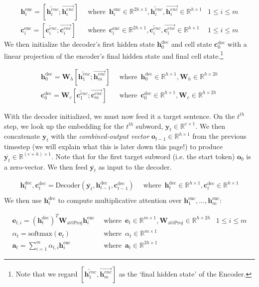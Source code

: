 \documentclass{assignment format}
\newcommand{\Real}{\mathbb{R}}
\newcommand{\henc}{\mathbf{h}^{\text{enc}}}
\newcommand{\hencfw}[1]{\overrightarrow{\mathbf{h}^{enc}_{#1}}}
\newcommand{\hencbw}[1]{\overleftarrow{\mathbf{h}^{enc}_{#1}}}
\newcommand{\cenc}{\mathbf{c}^{\text{enc}}}
\newcommand{\cencfw}[1]{\overrightarrow{\mathbf{c}^{enc}_{#1}}}
\newcommand{\cencbw}[1]{\overleftarrow{\mathbf{c}^{enc}_{#1}}}
\newcommand{\hdec}{\mathbf{h}^{\text{dec}}}
\newcommand{\cdec}{\mathbf{c}^{\text{dec}}}
\begin{document}
\begin{align}
    \henc_i = [\hencbw{i}; \hencfw{i}] \enspace &\text{where}\enspace \henc_i \in \Real^{2h \times 1}, \hencbw{i}, \hencfw{i} \in \Real^{h \times 1} &1 \le i \le m \\
    \cenc_i = [\cencbw{i}; \cencfw{i}] \enspace &\text{where} \enspace \cenc_i \in \Real^{2h \times 1}, \cencbw{i}, \cencfw{i} \in \Real^{h \times 1} &1 \le i \le m
\end{align}
We then initialize the decoder's first hidden state $\hdec_0$ and cell state $\cdec_0$ with a linear projection of the encoder's final hidden state and final cell state.\footnote{Note that we regard $[\hencbw{1}, \hencfw{m}]$ as the `final hidden state' of the Encoder.} 

\begin{align}
    \hdec_0 = \mathbf{W}_{h}[\hencbw{1}; \hencfw{m}] \enspace &\text{where} \enspace \hdec_0 \in \Real^{h \times 1}, \mathbf{W}_{h} \in \Real^{h \times 2h}\\
    \cdec_0 = \mathbf{W}_{c}[\cencbw{1}; \cencfw{m}] \enspace &\text{where} \enspace \cdec_0 \in \Real^{h \times 1}, \mathbf{W}_{c} \in \Real^{h \times 2h}
\end{align}


With the decoder initialized, we must now feed it a target sentence. On the $t^{th}$ step, we look up the embedding for the $t^{th}$ subword,  $\mathbf{y}_t \in \Real^{e \times 1}$. We then concatenate $\mathbf{y}_t$ with the \textit{combined-output vector} $\mathbf{o}_{t-1} \in \Real^{h \times 1}$ from the previous timestep (we will explain what this is later down this page!\@) to produce $\overline{\mathbf{y}_t} \in \Real^{(e+h) \times 1}$. Note that for the first target subword (i.e. the start token) $\mathbf{o}_{0}$ is a zero-vector. We then feed $\overline{\mathbf{y}_t}$ as input to the decoder. 

\begin{align}
    \hdec_t, \cdec_t = \text{Decoder}(\overline{\mathbf{y}_t}, \hdec_{t-1}, \cdec_{t-1}) \enspace &\text{where} \enspace \hdec_t \in \Real^{h \times 1}, \cdec_t \in \Real^{h \times 1}\\
\end{align}
We then use $\hdec_t$ to compute  multiplicative attention over $\henc_1, \dots, \henc_m$:

\begin{align}
    \mathbf{e}_{t, i} = (\hdec_t)^T\mathbf{W}_{\text{attProj}}\henc_i \enspace &\text{where} \enspace \mathbf{e}_{t} \in \Real^{m \times 1}, \mathbf{W}_{\text{attProj}}\in \Real^{h \times 2h} & 1 \le i \le m \\
    \alpha_t= \text{softmax}(\mathbf{e}_t) \enspace &\text{where} \enspace \alpha_t \in \Real^{m \times 1}\\
    \mathbf{a}_t = \sum_{i=1}^{m}\alpha_{t,i}\henc_i \enspace &\text{where} \enspace \mathbf{a}_t \in \Real^{2h \times 1}
\end{align}
 
\end{document}
